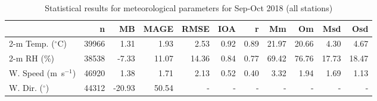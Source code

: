 \begin{table}
\centering
\caption{Statistical results for meteorological parameters for Sep-Oct 2018 (all stations)}
\label{tab:stats_all}
\begin{tabular}{lrrrrrrrrrr}
\toprule
{} &      n &     MB &   MAGE &   RMSE &   IOA &     r &     Mm &     Om &    Msd &    Osd \\
\midrule
2-m Temp. ($^{\circ}$C) &  39966 &   1.31 &   1.93 &   2.53 &  0.92 &  0.89 &  21.97 &  20.66 &   4.30 &   4.67 \\
2-m RH (\%) &  38538 &  -7.33 &  11.07 &  14.36 &  0.84 &  0.77 &  69.42 &  76.76 &  17.73 &  18.47 \\
W. Speed (m~s$^{-1}$) &  46920 &   1.38 &   1.71 &   2.13 &  0.52 &  0.40 &   3.32 &   1.94 &   1.69 &   1.13 \\
W. Dir. ($^{\circ}$) &  44312 & -20.93 &  50.54 &    - &   - &   - &    - &    - &    - &    - \\
\bottomrule

\end{tabular}
\end{table}

